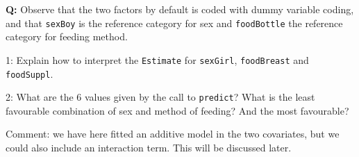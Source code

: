 \documentclass[
  ignorenonframetext,
]{beamer}
\begin{document}
\begin{frame}[fragile]
\textbf{Q:} Observe that the two factors by default is coded with dummy
variable coding, and that \texttt{sexBoy} is the reference category for
sex and \texttt{foodBottle} the reference category for feeding method.

1: Explain how to interpret the \texttt{Estimate} for \texttt{sexGirl},
\texttt{foodBreast} and \texttt{foodSuppl}.

2: What are the 6 values given by the call to \texttt{predict}? What is
the least favourable combination of sex and method of feeding? And the
most favourable?

Comment: we have here fitted an additive model in the two covariates,
but we could also include an interaction term. This will be discussed
later.
\end{frame}
\end{document}
